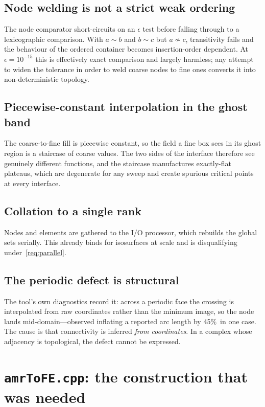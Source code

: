 \subsection{Node welding is not a strict weak ordering}

The node comparator short-circuits on an $\epsilon$ test before falling through
to a lexicographic comparison. With $a \sim b$ and $b \sim c$ but
$a \not\sim c$, transitivity fails and the behaviour of the ordered container
becomes insertion-order dependent. At $\epsilon = 10^{-15}$ this is effectively
exact comparison and largely harmless; any attempt to widen the tolerance in
order to weld coarse nodes to fine ones converts it into non-deterministic
topology.

\subsection{Piecewise-constant interpolation in the ghost band}

The coarse-to-fine fill is piecewise constant, so the field a fine box sees in
its ghost region is a staircase of coarse values. The two sides of the
interface therefore see genuinely different functions, and the staircase
manufactures exactly-flat plateaus, which are degenerate for any sweep and
create spurious critical points at every interface.

\subsection{Collation to a single rank}

Nodes and elements are gathered to the I/O processor, which rebuilds the global
sets serially. This already binds for isosurfaces at scale and is disqualifying
under~\ref{req:parallel}.

\subsection{The periodic defect is structural}

The tool's own diagnostics record it: across a periodic face the crossing is
interpolated from raw coordinates rather than the minimum image, so the node
lands mid-domain---observed inflating a reported arc length by 45\%\ in one
case. The cause is that connectivity is inferred \emph{from coordinates}. In a
complex whose adjacency is topological, the defect cannot be expressed.

\section{\texttt{amrToFE.cpp}: the construction that was needed}

